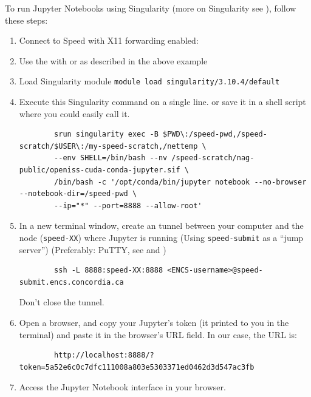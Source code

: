 To run Jupyter Notebooks using Singularity (more on Singularity see ), follow these steps:

\begin{enumerate}
	\item Connect to Speed with X11 forwarding enabled:
	\item Use the  with  or  as described in the above example
	\item Load Singularity module
		\verb+module load singularity/3.10.4/default+

	\item Execute this Singularity command on a single line. or save it in a shell script where you could easily call it.
	\small
	\begin{verbatim}
		srun singularity exec -B $PWD\:/speed-pwd,/speed-scratch/$USER\:/my-speed-scratch,/nettemp \
		--env SHELL=/bin/bash --nv /speed-scratch/nag-public/openiss-cuda-conda-jupyter.sif \
		/bin/bash -c '/opt/conda/bin/jupyter notebook --no-browser --notebook-dir=/speed-pwd \
		--ip="*" --port=8888 --allow-root'
	\end{verbatim}
	\normalsize

	\item In a new terminal window, create an  tunnel between your computer and the node (\texttt{speed-XX}) where Jupyter is
	running (Using \texttt{speed-submit} as a ``jump server'') (Preferably: PuTTY, see  and )
	\begin{verbatim}
		ssh -L 8888:speed-XX:8888 <ENCS-username>@speed-submit.encs.concordia.ca
	\end{verbatim}
	Don't close the tunnel.

	\item Open a browser, and copy your Jupyter's token (it printed to you in the terminal) and paste it in the browser's URL field.
	In our case, the URL is:
	\begin{verbatim}
		http://localhost:8888/?token=5a52e6c0c7dfc111008a803e5303371ed0462d3d547ac3fb
	\end{verbatim}

	\item Access the Jupyter Notebook interface in your browser.
\end{enumerate}

